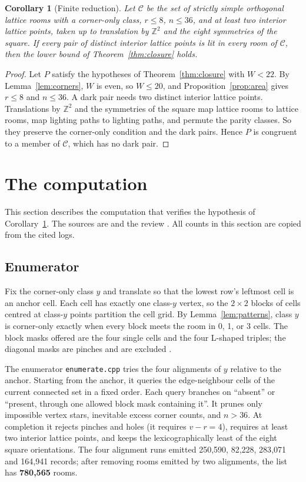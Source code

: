 \documentclass[11pt]{article}
\newtheorem{corollary}{Corollary}
\theoremstyle{definition}
\theoremstyle{remark}
\newcommand{\Z}{\mathbb Z}
\begin{document}
\begin{corollary}[Finite reduction]\label{cor:finite}
Let $\mathcal C$ be the set of strictly simple orthogonal lattice rooms
with a corner-only class, $r\le 8$, $n\le36$, and at least two interior
lattice points, taken up to translation by $\Z^2$ and the eight symmetries
of the square. If every pair of distinct interior lattice points is lit in
every room of $\mathcal C$, then the lower bound of
Theorem~\ref{thm:closure} holds.
\end{corollary}
\begin{proof}
Let $P$ satisfy the hypotheses of Theorem~\ref{thm:closure} with $W<22$.
By Lemma~\ref{lem:corners}, $W$ is even, so $W\le20$, and
Proposition~\ref{prop:area} gives $r\le8$ and $n\le36$. A dark pair needs
two distinct interior lattice points. Translations by $\Z^2$ and the
symmetries of the square map lattice rooms to lattice rooms, map lighting
paths to lighting paths, and permute the parity classes. So they preserve
the corner-only condition and the dark pairs. Hence $P$ is congruent to a
member of $\mathcal C$, which has no dark pair.
\end{proof}

\section{The computation}\label{sec:computation}
This section describes the computation that verifies the hypothesis of
Corollary~\ref{cor:finite}. The sources are \cite{qreadme} and the review
\cite{d102}. All counts in this section are copied from the cited logs.

\subsection{Enumerator}
Fix the corner-only class $y$ and translate so that the lowest row's
leftmost cell is an anchor cell. Each cell has exactly one class-$y$ vertex,
so the $2\times2$ blocks of cells centred at class-$y$ points partition the
cell grid. By Lemma~\ref{lem:patterns}, class $y$ is corner-only exactly
when every block meets the room in 0, 1, or 3 cells. The block masks
offered are the four single cells and the four L-shaped triples; the
diagonal masks are pinches and are excluded \cite[\S1, item 1]{d102}.

The enumerator \texttt{enumerate.cpp} \cite{qreadme} tries the four
alignments of $y$ relative to the anchor. Starting from the anchor, it
queries the edge-neighbour cells of the current connected set in a fixed
order. Each query branches on ``absent'' or ``present, through one allowed
block mask containing it''. It prunes only impossible vertex stars,
inevitable excess corner counts, and $n>36$. At completion it rejects
pinches and holes (it requires $v-r=4$), requires at least two interior
lattice points, and keeps the lexicographically least of the eight square
orientations. The four alignment runs emitted 250{,}590, 82{,}228,
283{,}071 and 164{,}941 records; after removing rooms emitted by two
alignments, the list has \textbf{780{,}565} rooms.
\end{document}
